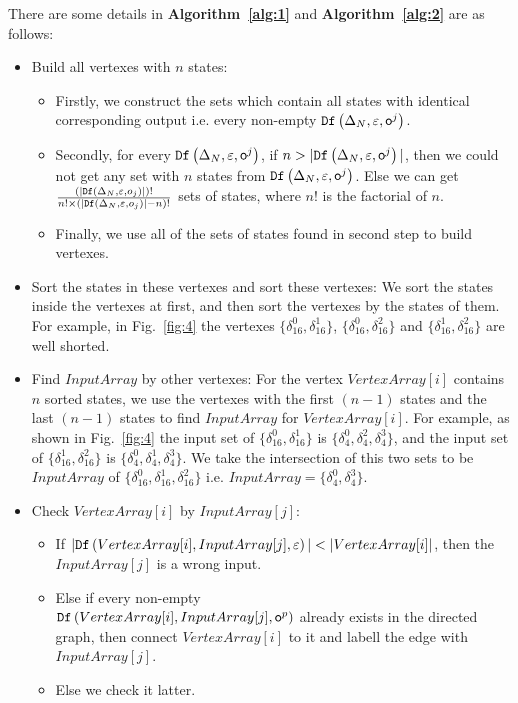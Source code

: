 There are some details in {\bf Algorithm~\ref{alg:1}} and {\bf Algorithm~\ref{alg:2}} are as follows:
\begin{itemize}
\item Build all vertexes with $n$ states:
\begin{itemize}
\item Firstly, we construct the sets which contain all states with identical corresponding output i.e. every non-empty ${\tt Df}\left(\Delta_N,\varepsilon,\mathsf{o}^{j}\right)$.
\item Secondly, for every ${\tt Df}\left(\Delta_N,\varepsilon,\mathsf{o}^{j}\right)$, if $n>|{\tt Df}\left(\Delta_N,\varepsilon,\mathsf{o}^{j}\right)|$, then we could not get any set with $n$ states from ${\tt Df}\left(\Delta_N,\varepsilon,\mathsf{o}^{j}\right)$. Else we can get $\frac{(|{\tt Df}\left(\Delta_N,\varepsilon,o_j\right)|)!}{n!\times (|{\tt Df}\left(\Delta_N,\varepsilon,o_j\right)|-n)!}$ sets of states, where $n!$ is the factorial of $n$.
\item Finally, we use all of the sets of states found in second step to build vertexes. 
\end{itemize} 
 \item Sort the states in these vertexes and sort these vertexes: We sort the states inside the vertexes at first, and then sort the vertexes by the states of them. For example, in Fig.~\ref{fig:4} the vertexes $\{\delta_{16}^0,\delta_{16}^1\}$, $\{\delta_{16}^0,\delta_{16}^2\}$ and $\{\delta_{16}^1,\delta_{16}^2\}$ are well shorted. 
  \item Find $InputArray$ by other vertexes:
   For the vertex $VertexArray[i]$ contains $n$ sorted states, we use the vertexes with the first $(n-1)$ states and the last $(n-1)$ states to find $InputArray$ for $VertexArray[i]$. For example, as shown in Fig.~\ref{fig:4} the input set of $\{\delta_{16}^0,\delta_{16}^1\}$ is $\{\delta_{4}^0,\delta_{4}^2,\delta_{4}^3\}$, and the input set of $\{\delta_{16}^1,\delta_{16}^2\}$ is $\{\delta_{4}^0,\delta_{4}^1,\delta_{4}^3\}$. We take the intersection of this two sets to be $InputArray$ of $\{\delta_{16}^0,\delta_{16}^1,\delta_{16}^2\}$ i.e. $InputArray=\{\delta_{4}^0,\delta_{4}^3\}$. 
  \item Check $VertexArray[i]$ by $InputArray[j]$:
     
\begin{itemize}
\item If $|\Ded\left(VertexArray[i],InputArray[j],\varepsilon\right)|<|VertexArray[i]|$, then the $InputArray[j]$ is a wrong input.
\item Else if every non-empty \\${\tt Df}\left(VertexArray[i],InputArray[j],\mathsf{o}^{p}\right)$ already exists in the directed graph, then connect $VertexArray[i]$ to it and labell the edge with $InputArray[j]$.
\item Else we check it latter. 
\end{itemize} 
\end{itemize} 


